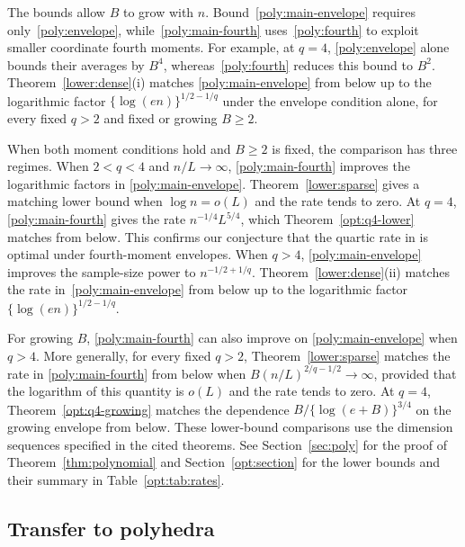 \documentclass[11pt,letterpaper]{article}
\newenvironment{recovered}{}{}
\theoremstyle{remark}
\begin{document}
\begin{recovered}
The bounds allow \(B\) to grow with \(n\).
Bound~\eqref{poly:main-envelope} requires only~\eqref{poly:envelope},
while~\eqref{poly:main-fourth} uses~\eqref{poly:fourth} to exploit
smaller coordinate fourth moments. For example, at \(q=4\),
\eqref{poly:envelope} alone bounds their averages by \(B^4\),
whereas~\eqref{poly:fourth} reduces this bound to \(B^2\).
Theorem~\ref{lower:dense}\textup{(i)} matches
\eqref{poly:main-envelope} from below up to the logarithmic factor
\(\{\log(en)\}^{1/2-1/q}\) under the envelope condition alone,
for every fixed \(q>2\) and fixed or growing \(B\ge2\).

When both moment conditions hold and \(B\ge2\) is fixed, the
comparison has three regimes.
When \(2<q<4\) and \(n/L\to\infty\),
\eqref{poly:main-fourth} improves the logarithmic factors in
\eqref{poly:main-envelope}. Theorem~\ref{lower:sparse} gives a
matching lower bound when \(\log n=o(L)\) and the rate tends to zero.
At \(q=4\), \eqref{poly:main-fourth} gives the rate
\(n^{-1/4}L^{5/4}\), which Theorem~\ref{opt:q4-lower} matches from below.
This confirms our conjecture that the quartic rate in
\cite[Theorem~2.5]{CCKK2022} is optimal under fourth-moment envelopes.
When \(q>4\), \eqref{poly:main-envelope} improves the sample-size
power to \(n^{-1/2+1/q}\). Theorem~\ref{lower:dense}\textup{(ii)} matches the
rate in~\eqref{poly:main-envelope} from below up to the logarithmic factor
\(\{\log(en)\}^{1/2-1/q}\).

For growing \(B\), \eqref{poly:main-fourth} can also improve on
\eqref{poly:main-envelope} when \(q>4\). More generally, for every
fixed \(q>2\), Theorem~\ref{lower:sparse} matches the rate in
\eqref{poly:main-fourth} from below when \(B(n/L)^{2/q-1/2}\to\infty\),
provided that the logarithm of this quantity is \(o(L)\) and the
rate tends to zero. At \(q=4\), Theorem~\ref{opt:q4-growing}
matches the dependence \(B/\{\log(e+B)\}^{3/4}\) on the growing
envelope from below. These lower-bound comparisons use the dimension sequences
specified in the cited theorems. See Section~\ref{sec:poly} for
the proof of Theorem~\ref{thm:polynomial} and
Section~\ref{opt:section} for the lower bounds and their summary
in Table~\ref{opt:tab:rates}.
\end{recovered}

\subsection{Transfer to polyhedra}\label{sec:polyhedral-transfer}
\end{document}

